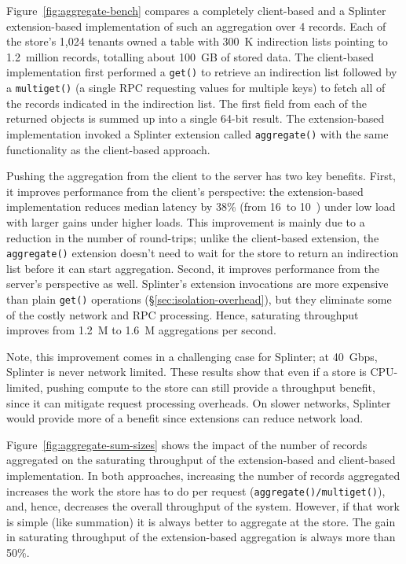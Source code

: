 Figure~\ref{fig:aggregate-bench} compares a completely client-based and a
  Splinter extension-based implementation of such an aggregation over 4
  records.
Each of the store's 1,024 tenants owned a table with 300~K
  indirection lists pointing to 1.2~million records, totalling about 100~GB of
  stored data.
The client-based implementation first performed a \texttt{get()} to
  retrieve an indirection list followed by a \texttt{multiget()} (a single RPC
  requesting values for multiple keys) to fetch all of the records indicated in
  the indirection list.
The first field from each of the returned objects is summed up into a single
  64-bit result.
The extension-based implementation invoked a Splinter extension called
  \texttt{aggregate()} with the same functionality as the client-based approach.

Pushing the aggregation from the client to the server has two key benefits.
First, it improves performance from the client's perspective: the
  extension-based implementation reduces median latency by 38\% (from
  16~\us to 10~\us) under low load with larger gains under higher loads.
This improvement is mainly due to a reduction in the number of round-trips;
unlike the client-based extension, the \texttt{aggregate()} extension doesn't
  need to wait for the store to return an indirection list before it can start
  aggregation.
Second, it improves performance from the server's perspective as well.
Splinter's extension invocations are more expensive than plain \texttt{get()}
  operations (\S\ref{sec:isolation-overhead}), but they eliminate
  some of the costly network and RPC processing.
Hence, saturating throughput improves from 1.2~M to 1.6~M aggregations
  per second.

Note, this improvement comes in a challenging case for Splinter; at 40~Gbps,
  Splinter is never network limited.
These results show that even if a store is CPU-limited, pushing compute to the
  store can still provide a throughput benefit, since it can mitigate
  request processing overheads.
On slower networks, Splinter would provide more of a benefit since extensions
  can reduce network load.

Figure~\ref{fig:aggregate-sum-sizes} shows the impact of the number of
  records aggregated on the saturating throughput of the extension-based
  and client-based implementation.
In both approaches, increasing the number of records aggregated
  increases the work the store has to do per request
  (\texttt{aggregate()/multiget()}), and, hence, decreases the overall
  throughput of the system. 
However, if that work is simple (like summation) it is always better to
  aggregate at the store.
The gain in saturating throughput of the extension-based aggregation is
  always more than 50\%.

